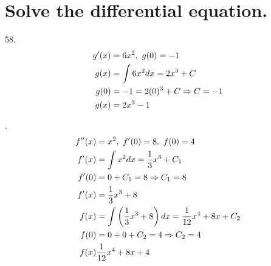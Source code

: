 \documentclass[11pt]{article}
\newcommand*{\vs}{\vspace{1cm}}
\newcommand*{\next}{\noindent}
\newcommand*{\set}{\setcounter{equation}{0}}
\begin{document}
\section{Solve the differential equation.}
58.\begin{align}
    \set
    g'(x)&=6x^2,\,\, g(0)=-1\\
    g(x)&=\int 6x^2dx=2x^3+C\\
    g(0)&=-1=2(0)^3+C\Rightarrow C=-1\\
    g(x)&=2x^3-1
\end{align}

\vs\next
62.\begin{align}
    \set
    f''(x)&=x^2,\,\, f'(0)=8,\,\, f(0)=4\\
    f'(x)&=\int x^2dx=\frac{1}{3}x^3+C_1\\
    f'(0)&=0+C_1=8\Rightarrow C_1=8\\
    f'(x)&=\frac{1}{3}x^3+8\\
    f(x)&=\int\left(\frac{1}{3}x^3+8\right)dx=\frac{1}{12}x^4+8x+C_2\\
    f(0)&=0+0+C_2=4\Rightarrow C_2=4\\
    f(x)&\frac{1}{12}x^4+8x+4
\end{align}
\end{document}
